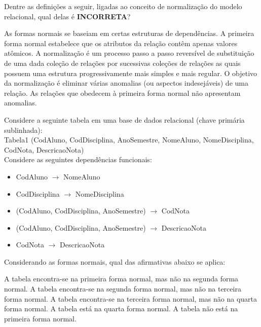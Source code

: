 \documentclass[12pt, addpoints]{exam}
\begin{document}
\begin{questions}
\question

Dentre as definições a seguir, ligadas ao conceito de normalização do modelo relacional, qual delas é \textbf{INCORRETA}?


\begin{choices}
\choice As formas normais se baseiam em certas estruturas de dependências.
\choice A primeira forma normal estabelece que os atributos da relação contêm apenas valores atômicos.
\choice A normalização é um processo passo a passo reversível de substituição de uma dada coleção de relações por sucessivas coleções de relações as quais possuem uma estrutura progressivamente mais simples e mais regular.
\choice O objetivo da normalização é eliminar várias anomalias (ou aspectos indesejáveis) de uma relação.
\choice As relações que obedecem à primeira forma normal não apresentam anomalias.
\end{choices}

\question

Considere a seguinte tabela em uma base de dados relacional (chave primária sublinhada):\\

Tabela1 (CodAluno, CodDisciplina, AnoSemestre, NomeAluno, NomeDisciplina, CodNota, DescricaoNota)\\

Considere as seguintes dependências funcionais:

\begin{itemize}

    \item CodAluno \(\rightarrow\) NomeAluno

    \item CodDisciplina \(\rightarrow\) NomeDisciplina

    \item (CodAluno, CodDisciplina, AnoSemestre) \(\rightarrow\) CodNota

    \item (CodAluno, CodDisciplina, AnoSemestre) \(\rightarrow\) DescricaoNota

    \item CodNota \(\rightarrow\) DescricaoNota

\end{itemize}



Considerando as formas normais, qual das afirmativas abaixo se aplica:
\begin{choices}
\choice A tabela encontra-se na primeira forma normal, mas não na segunda forma normal.
\choice A tabela encontra-se na segunda forma normal, mas não na terceira forma normal.
\choice A tabela encontra-se na terceira forma normal, mas não na quarta forma normal.
\choice A tabela está na quarta forma normal.
\choice A tabela não está na primeira forma normal.
\end{choices}


\end{questions}
\end{document}
